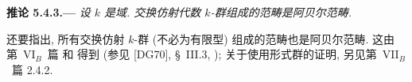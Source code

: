 \medskip
{}\label{cor:sga3-VIA-5.4.3}%
\noindent\textbf{推论 5.4.3.---}
\emph{设 \(k\) 是域. 交换仿射代数 \(k\)-群组成的范畴是阿贝尔范畴.}

还要指出, 所有交换仿射 \(k\)-群 (不必为有限型) 组成的范畴也是阿贝尔范畴.
这由第~VI\(_B\)~篇  和
 得到
(参见 \textup{[DG70]}, \S~III.3, );
关于使用形式群的证明, 另见第~VII\(_B\)~篇 2.4.2.
